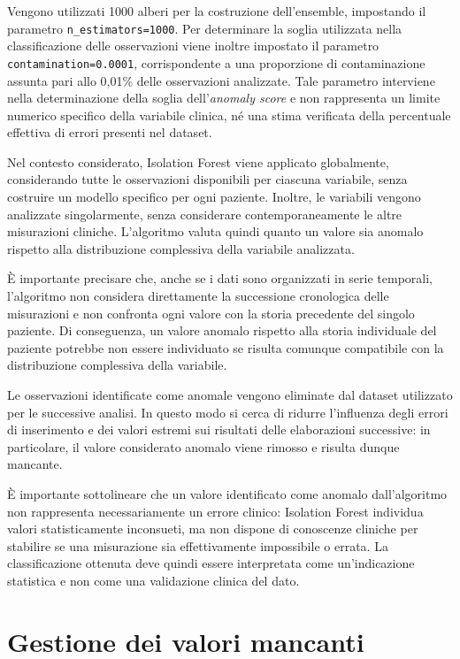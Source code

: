 \documentclass[a4paper,12pt]{report}
\begin{document}
Vengono utilizzati 1000 alberi per la costruzione dell'ensemble, impostando il parametro \texttt{n\_estimators=1000}. Per determinare la soglia utilizzata nella classificazione delle osservazioni viene inoltre impostato il parametro \texttt{contamination=0.0001}, corrispondente a una proporzione di contaminazione assunta pari allo 0,01\% delle osservazioni analizzate. Tale parametro interviene nella determinazione della soglia dell'\textit{anomaly score} e non rappresenta un limite numerico specifico della variabile clinica, né una stima verificata della percentuale effettiva di errori presenti nel dataset.

Nel contesto considerato, Isolation Forest viene applicato globalmente, considerando tutte le osservazioni disponibili per ciascuna variabile, senza costruire un modello specifico per ogni paziente. Inoltre, le variabili vengono analizzate singolarmente, senza considerare contemporaneamente le altre misurazioni cliniche. L'algoritmo valuta quindi quanto un valore sia anomalo rispetto alla distribuzione complessiva della variabile analizzata.

È importante precisare che, anche se i dati sono organizzati in serie temporali, l'algoritmo non considera direttamente la successione cronologica delle misurazioni e non confronta ogni valore con la storia precedente del singolo paziente. Di conseguenza, un valore anomalo rispetto alla storia individuale del paziente potrebbe non essere individuato se risulta comunque compatibile con la distribuzione complessiva della variabile.

Le osservazioni identificate come anomale vengono eliminate dal dataset utilizzato per le successive analisi. In questo modo si cerca di ridurre l'influenza degli errori di inserimento e dei valori estremi sui risultati delle elaborazioni successive: in particolare, il valore considerato anomalo viene rimosso e risulta dunque mancante.

È importante sottolineare che un valore identificato come anomalo dall'algoritmo non rappresenta necessariamente un errore clinico: Isolation Forest individua valori statisticamente inconsueti, ma non dispone di conoscenze cliniche per stabilire se una misurazione sia effettivamente impossibile o errata. La classificazione ottenuta deve quindi essere interpretata come un'indicazione statistica e non come una validazione clinica del dato.

\section{Gestione dei valori mancanti}
\label{sec:missing}
\end{document}

